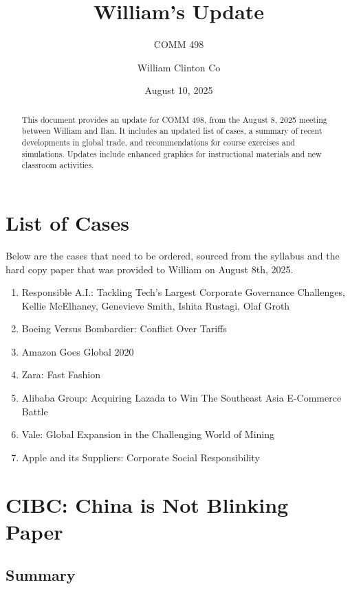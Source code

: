 \documentclass[
  11pt,
]{article}
\title{William's Update}
\subtitle{COMM 498}
\author{William Clinton Co}
\date{August 10, 2025}
\renewcommand*\contentsname{Table of contents}
\newcommand\contentsname{Table of contents}
\begin{document}
\maketitle
\begin{abstract}
This document provides an update for COMM 498, from the August 8, 2025
meeting between William and Ilan. It includes an updated list of cases,
a summary of recent developments in global trade, and recommendations
for course exercises and simulations. Updates include enhanced graphics
for instructional materials and new classroom activities.
\end{abstract}

\renewcommand*\contentsname{Table of contents}
{
\hypersetup{linkcolor=}
\setcounter{tocdepth}{3}
\tableofcontents
}

\section{List of Cases}\label{list-of-cases}

Below are the cases that need to be ordered, sourced from the syllabus
and the hard copy paper that was provided to William on August 8th,
2025.

\begin{enumerate}
\def\labelenumi{\arabic{enumi}.}
\item
  Responsible A.I.: Tackling Tech's Largest Corporate Governance
  Challenges, Kellie McElhaney, Genevieve Smith, Ishita Rustagi, Olaf
  Groth
\item
  Boeing Versus Bombardier: Conflict Over Tariffs
\item
  Amazon Goes Global 2020
\item
  Zara: Fast Fashion
\item
  Alibaba Group: Acquiring Lazada to Win The Southeast Asia E-Commerce
  Battle
\item
  Vale: Global Expansion in the Challenging World of Mining
\item
  Apple and its Suppliers: Corporate Social Responsibility
\end{enumerate}

\section{CIBC: China is Not Blinking
Paper}\label{cibc-china-is-not-blinking-paper}

\subsection{Summary}\label{summary}
\end{document}

